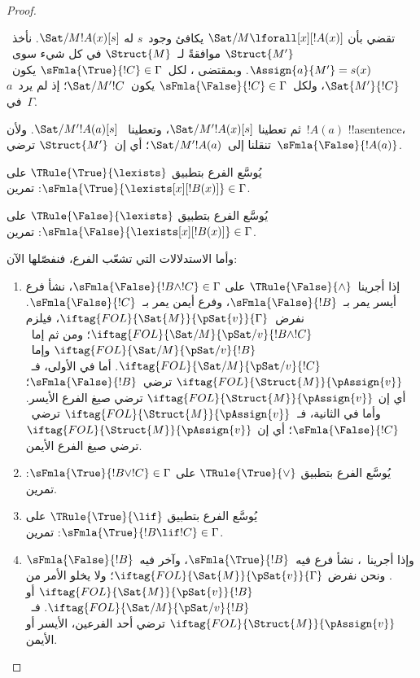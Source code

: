 \documentclass[../../../include/open-logic-section]{subfiles}
\begin{document}
\begin{proof}
\begin{enumerate}
{  تقضي  بأن
  $\Sat/{M}{\lforall[x][!A(x)]}$ يكافئ وجود~$s$ له
  $\Sat/{M}{!A(x)}[s]$. نأخذ~$\Struct{M'}$ موافقةً
  لـ~$\Struct{M}$ في كل شيء سوى~$\Assign{a}{M'} = s(x)$.
  وبمقتضى ،
  لكل~$\sFmla{\True}{!C} \in \Gamma$ يكون~$\Sat{M'}{!C}$،
  ولكل~$\sFmla{\False}{!C} \in \Gamma$ يكون~$\Sat/{M'}{!C}$؛
  إذ لم يرد~$a$ في~$\Gamma$.

  ثم تعطينا 
  $\Sat/{M'}{!A(x)}[s]$، وتعطينا
  ~$\Sat/{M'}{!A(a)}[s]$.
  ولأن~$!A(a)$ !!a{sentence}، تنقلنا
   إلى~$\Sat/{M'}{!A(a)}$؛
  أي إن~$\Struct{M'}$ ترضي~$\sFmla{\False}{!A(a)}$.
\item يُوسَّع الفرع بتطبيق $\TRule{\True}{\lexists}$ على
  $\sFmla{\True}{\lexists[x][!B(x)]} \in \Gamma$: تمرين.
\item يُوسَّع الفرع بتطبيق $\TRule{\False}{\lexists}$ على
  $\sFmla{\False}{\lexists[x][!B(x)]} \in \Gamma$: تمرين.}{}
\end{enumerate}
وأما الاستدلالات التي تشعّب الفرع، فنفصّلها الآن:
\begin{enumerate}
\item إذا أجرينا~$\TRule{\False}{\land}$ على
  $\sFmla{\False}{!B \land !C} \in \Gamma$،
  نشأ فرع أيسر يمر بـ~$\sFmla{\False}{!B}$،
  وفرع أيمن يمر بـ~$\sFmla{\False}{!C}$.
  نفرض~$\iftag{FOL}{\Sat{M}}{\pSat{v}}{\Gamma}$، فيلزم
  $\iftag{FOL}{\Sat/{M}}{\pSat/{v}}{!B \land !C}$؛
  ومن ثم إما~$\iftag{FOL}{\Sat/{M}}{\pSat/{v}}{!B}$
  وإما~$\iftag{FOL}{\Sat/{M}}{\pSat/{v}}{!C}$.
  أما في الأولى، فـ~$\iftag{FOL}{\Struct{M}}{\pAssign{v}}$
  ترضي~$\sFmla{\False}{!B}$؛ أي إن
  $\iftag{FOL}{\Struct{M}}{\pAssign{v}}$ ترضي صيغ الفرع الأيسر.
  وأما في الثانية، فـ~$\iftag{FOL}{\Struct{M}}{\pAssign{v}}$
  ترضي~$\sFmla{\False}{!C}$؛ أي إن
  $\iftag{FOL}{\Struct{M}}{\pAssign{v}}$ ترضي صيغ الفرع الأيمن.
\item يُوسَّع الفرع بتطبيق $\TRule{\True}{\lor}$ على
  $\sFmla{\True}{!B \lor !C} \in \Gamma$: تمرين.
\item يُوسَّع الفرع بتطبيق $\TRule{\True}{\lif}$ على
  $\sFmla{\True}{!B \lif !C} \in \Gamma$: تمرين.
\item وإذا أجرينا~\Cut، نشأ فرع فيه~$\sFmla{\True}{!B}$،
  وآخر فيه~$\sFmla{\False}{!B}$. ونحن نفرض
  $\iftag{FOL}{\Sat{M}}{\pSat{v}}{\Gamma}$؛ ولا يخلو الأمر من
  $\iftag{FOL}{\Sat{M}}{\pSat{v}}{!B}$ أو
  $\iftag{FOL}{\Sat/{M}}{\pSat/{v}}{!B}$.
  فـ~$\iftag{FOL}{\Struct{M}}{\pAssign{v}}$ ترضي أحد الفرعين،
  الأيسر أو الأيمن.
\end{enumerate}
\end{proof}
\end{document}
